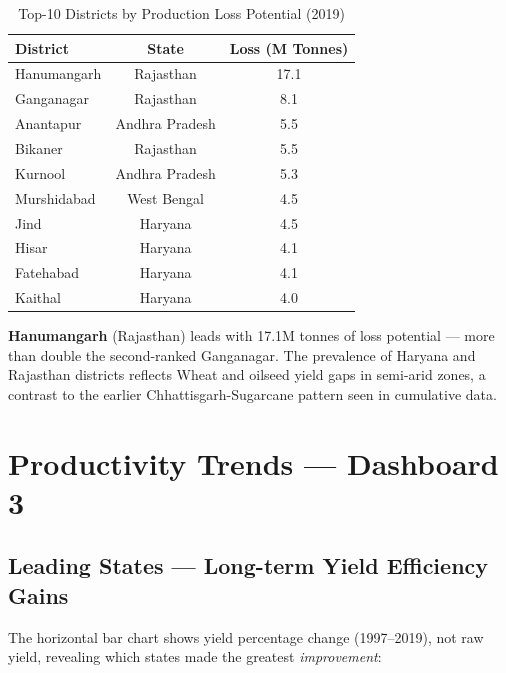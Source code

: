 \documentclass[10pt]{article}
\begin{document}
\begin{table}[H]
  \centering
  \caption{Top-10 Districts by Production Loss Potential (2019)}
  \label{tab:loss}
  \small
  \begin{tabular}{lcc}
    \toprule
    \textbf{District} & \textbf{State} & \textbf{Loss (M Tonnes)} \\
    \midrule
    Hanumangarh   & Rajasthan  & 17.1 \\
    Ganganagar    & Rajasthan  & 8.1  \\
    Anantapur     & Andhra Pradesh & 5.5 \\
    Bikaner       & Rajasthan  & 5.5  \\
    Kurnool       & Andhra Pradesh & 5.3 \\
    Murshidabad   & West Bengal & 4.5 \\
    Jind          & Haryana    & 4.5  \\
    Hisar         & Haryana    & 4.1  \\
    Fatehabad     & Haryana    & 4.1  \\
    Kaithal       & Haryana    & 4.0  \\
    \bottomrule
  \end{tabular}
\end{table}

\textbf{Hanumangarh} (Rajasthan) leads with 17.1M tonnes of loss potential —
more than double the second-ranked Ganganagar. The prevalence of Haryana and
Rajasthan districts reflects Wheat and oilseed yield gaps in semi-arid zones,
a contrast to the earlier Chhattisgarh-Sugarcane pattern seen in cumulative data.

\section{Productivity Trends — Dashboard 3}

\subsection{Leading States — Long-term Yield Efficiency Gains}
The horizontal bar chart shows yield percentage change (1997–2019), not raw
yield, revealing which states made the greatest \emph{improvement}:
\end{document}
